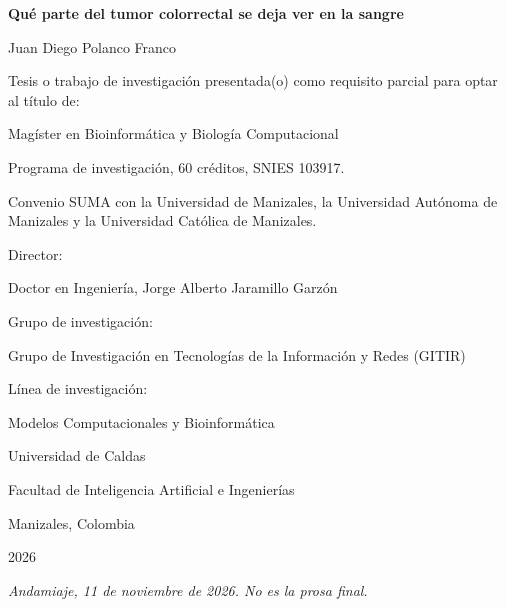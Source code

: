 \thispagestyle{empty}
\begin{center}
\vspace*{1.2cm}
{\fontsize{16}{20}\selectfont\bfseries Qué parte del tumor colorrectal se deja ver en la sangre\par}
\vspace{1.2cm}
{\fontsize{14}{18}\selectfont Juan Diego Polanco Franco\par}
\vspace{1cm}
\begin{minipage}{0.92\textwidth}
\centering
Tesis o trabajo de investigación presentada(o) como requisito parcial para optar al título de:\par
\vspace{0.4cm}
Magíster en Bioinformática y Biología Computacional\par
\vspace{0.3cm}
\fontsize{10}{13}\selectfont
Programa de investigación, 60 créditos, SNIES 103917.\par
Convenio SUMA con la Universidad de Manizales, la Universidad Autónoma de Manizales y la Universidad Católica de Manizales.\par
\normalsize
\end{minipage}
\vspace{0.9cm}
\end{center}
\noindent Director:\par
Doctor en Ingeniería, Jorge Alberto Jaramillo Garzón\par
\vspace{0.4cm}
\noindent Grupo de investigación:\par
Grupo de Investigación en Tecnologías de la Información y Redes (GITIR)\par
\vspace{0.4cm}
\noindent Línea de investigación:\par
Modelos Computacionales y Bioinformática\par
\vspace{1.2cm}
\begin{center}
Universidad de Caldas\par
Facultad de Inteligencia Artificial e Ingenierías\par
Manizales, Colombia\par
2026\par
\vspace{0.6cm}
{\fontsize{10}{12}\selectfont\textit{Andamiaje, 11 de noviembre de 2026. No es la prosa final.}\par}
\end{center}
\clearpage
